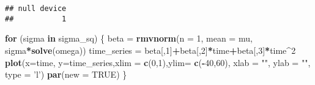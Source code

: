 \documentclass[]{article}
\newenvironment{Shaded}{\begin{snugshade}}{\end{snugshade}}
\newcommand{\ControlFlowTok}[1]{\textcolor[rgb]{0.13,0.29,0.53}{\textbf{#1}}}
\newcommand{\DataTypeTok}[1]{\textcolor[rgb]{0.13,0.29,0.53}{#1}}
\newcommand{\DecValTok}[1]{\textcolor[rgb]{0.00,0.00,0.81}{#1}}
\newcommand{\KeywordTok}[1]{\textcolor[rgb]{0.13,0.29,0.53}{\textbf{#1}}}
\newcommand{\NormalTok}[1]{#1}
\newcommand{\OperatorTok}[1]{\textcolor[rgb]{0.81,0.36,0.00}{\textbf{#1}}}
\newcommand{\OtherTok}[1]{\textcolor[rgb]{0.56,0.35,0.01}{#1}}
\newcommand{\StringTok}[1]{\textcolor[rgb]{0.31,0.60,0.02}{#1}}
\begin{document}
\begin{verbatim}
## null device 
##           1
\end{verbatim}

\begin{Shaded}
\begin{Highlighting}[]
\ControlFlowTok{for}\NormalTok{ (sigma }\ControlFlowTok{in}\NormalTok{ sigma_sq) \{}
\NormalTok{  beta =}\StringTok{ }\KeywordTok{rmvnorm}\NormalTok{(}\DataTypeTok{n =} \DecValTok{1}\NormalTok{, }\DataTypeTok{mean =}\NormalTok{ mu, sigma}\OperatorTok{*}\KeywordTok{solve}\NormalTok{(omega)) }
\NormalTok{  time_series =}\StringTok{ }\NormalTok{beta[,}\DecValTok{1}\NormalTok{]}\OperatorTok{+}\NormalTok{beta[,}\DecValTok{2}\NormalTok{]}\OperatorTok{*}\NormalTok{time}\OperatorTok{+}\NormalTok{beta[,}\DecValTok{3}\NormalTok{]}\OperatorTok{*}\NormalTok{time}\OperatorTok{^}\DecValTok{2}
  \KeywordTok{plot}\NormalTok{(}\DataTypeTok{x=}\NormalTok{time, }\DataTypeTok{y=}\NormalTok{time_series,}\DataTypeTok{xlim =} \KeywordTok{c}\NormalTok{(}\DecValTok{0}\NormalTok{,}\DecValTok{1}\NormalTok{),}\DataTypeTok{ylim=} \KeywordTok{c}\NormalTok{(}\OperatorTok{-}\DecValTok{40}\NormalTok{,}\DecValTok{60}\NormalTok{), }\DataTypeTok{xlab =} \StringTok{""}\NormalTok{, }\DataTypeTok{ylab =} \StringTok{""}\NormalTok{, }\DataTypeTok{type =} \StringTok{'l'}\NormalTok{)}
  \KeywordTok{par}\NormalTok{(}\DataTypeTok{new =} \OtherTok{TRUE}\NormalTok{)}
\NormalTok{\}}
\end{Highlighting}
\end{Shaded}
\end{document}
